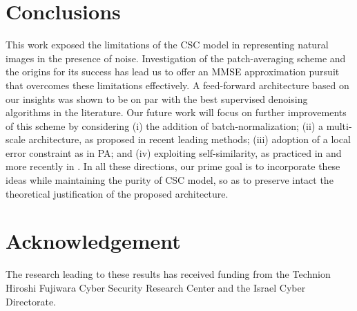 \documentclass{article}
\begin{document}
\section{Conclusions}
This work exposed the limitations of the CSC model in representing natural images in the presence of noise. Investigation of the patch-averaging scheme and the origins for its success has lead us to offer an MMSE approximation pursuit that overcomes these limitations effectively. A feed-forward architecture based on our insights was shown to be on par with the best supervised denoising algorithms in the literature. Our future work will focus on further improvements of this scheme by considering (i) the addition of  batch-normalization; (ii) a multi-scale architecture, as proposed in recent leading methods; (iii) adoption of a local error constraint as in PA; and (iv) exploiting self-similarity, as practiced in \cite{mairal2009non} and more recently in \cite{liu2018non}. In all these directions, our prime goal is to incorporate these ideas while maintaining the purity of CSC model, so as to preserve intact the theoretical justification of the proposed architecture. 

\section*{Acknowledgement}
The research leading to these results has received funding from the  Technion Hiroshi Fujiwara Cyber Security Research Center and the Israel Cyber Directorate.

\small


\end{document}
